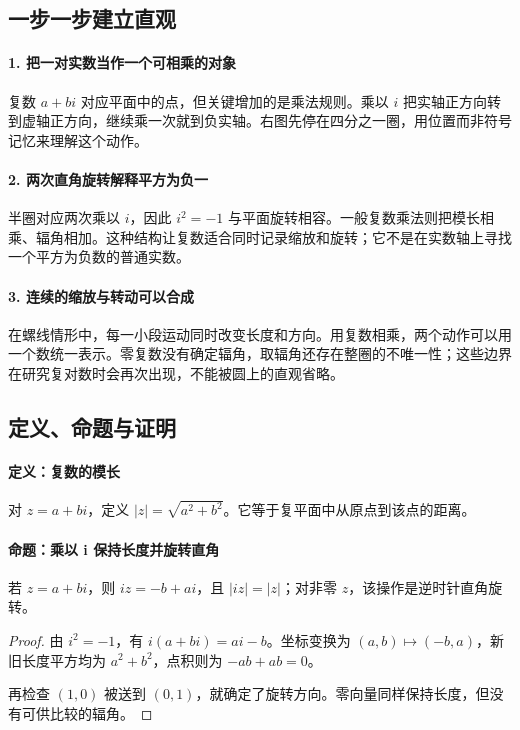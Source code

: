 \subsection*{一步一步建立直观}

\paragraph{1. 把一对实数当作一个可相乘的对象}

复数 $a+bi$ 对应平面中的点，但关键增加的是乘法规则。乘以 $i$ 把实轴正方向转到虚轴正方向，继续乘一次就到负实轴。右图先停在四分之一圈，用位置而非符号记忆来理解这个动作。



\paragraph{2. 两次直角旋转解释平方为负一}

半圈对应两次乘以 $i$，因此 $i^2=-1$ 与平面旋转相容。一般复数乘法则把模长相乘、辐角相加。这种结构让复数适合同时记录缩放和旋转；它不是在实数轴上寻找一个平方为负数的普通实数。



\paragraph{3. 连续的缩放与转动可以合成}

在螺线情形中，每一小段运动同时改变长度和方向。用复数相乘，两个动作可以用一个数统一表示。零复数没有确定辐角，取辐角还存在整圈的不唯一性；这些边界在研究复对数时会再次出现，不能被圆上的直观省略。



\subsection*{定义、命题与证明}

\paragraph{定义：复数的模长}

对 $z=a+bi$，定义 $|z|=\sqrt{a^2+b^2}$。它等于复平面中从原点到该点的距离。

\paragraph{命题：乘以 i 保持长度并旋转直角}

若 $z=a+bi$，则 $iz=-b+ai$，且 $|iz|=|z|$；对非零 $z$，该操作是逆时针直角旋转。

\begin{proof}

由 $i^2=-1$，有 $i(a+bi)=ai-b$。坐标变换为 $(a,b)\mapsto(-b,a)$，新旧长度平方均为 $a^2+b^2$，点积则为 $-ab+ab=0$。

再检查 $(1,0)$ 被送到 $(0,1)$，就确定了旋转方向。零向量同样保持长度，但没有可供比较的辐角。

\end{proof}
